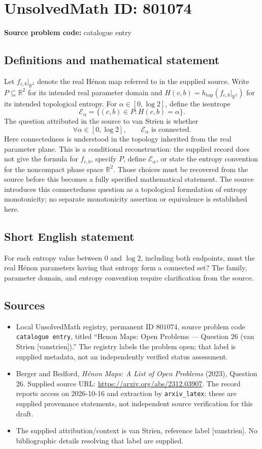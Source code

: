 \documentclass[11pt]{article}
\newcommand{\R}{\mathbb{R}}
\begin{document}
\section*{UnsolvedMath ID: 801074}
\textbf{Source problem code:} catalogue entry
\subsection{Definitions and mathematical statement}
Let \(f_{c,b}|_{\R^2}\) denote the real H\'enon map referred to in the supplied source. Write \(P\subseteq\R^2\) for its intended real parameter domain and \(H(c,b)=h_{\mathrm{top}}(f_{c,b}|_{\R^2})\) for its intended topological entropy. For \(\alpha\in[0,\log 2]\), define the isentrope
\[
\mathcal E_\alpha=\{(c,b)\in P:H(c,b)=\alpha\}.
\]
The question attributed in the source to van Strien is whether
\[
\forall\alpha\in[0,\log 2],\qquad \mathcal E_\alpha\text{ is connected}.
\]
Here connectedness is understood in the topology inherited from the real parameter plane. This is a conditional reconstruction: the supplied record does not give the formula for \(f_{c,b}\), specify \(P\), define \(\mathcal E_\alpha\), or state the entropy convention for the noncompact phase space \(\R^2\). Those choices must be recovered from the source before this becomes a fully specified mathematical statement. The source introduces this connectedness question as a topological formulation of entropy monotonicity; no separate monotonicity assertion or equivalence is established here.
\subsection{Short English statement}
For each entropy value between \(0\) and \(\log 2\), including both endpoints, must the real H\'enon parameters having that entropy form a connected set? The family, parameter domain, and entropy convention require clarification from the source.
\subsection{Sources}
\begin{itemize}
\item Local UnsolvedMath registry, permanent ID \(801074\), source problem code \texttt{catalogue entry}, titled ``Henon Maps: Open Problems --- Question 26 (van Strien [vanstrien]).'' The registry labels the problem open; that label is supplied metadata, not an independently verified status assessment.
\item Berger and Bedford, \emph{H\'enon Maps: A List of Open Problems} (2023), Question 26. Supplied source URL: \url{https://arxiv.org/abs/2312.03907}. The record reports access on 2026-10-16 and extraction by \texttt{arxiv\_latex}; these are supplied provenance statements, not independent source verification for this draft.
\item The supplied attribution/context is van Strien, reference label [vanstrien]. No bibliographic details resolving that label are supplied.
\end{itemize}
\end{document}
